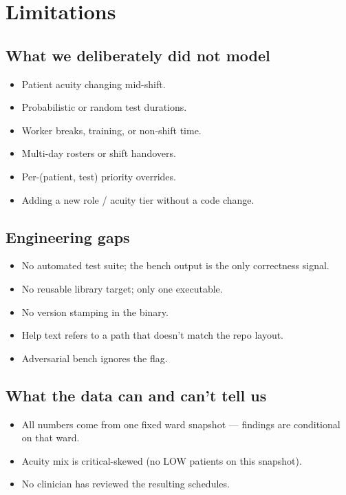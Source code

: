 \section{Limitations}
\label{sec:limitations}

\subsection{What we deliberately did not model}

\begin{itemize}
  \item Patient acuity changing mid-shift.
  \item Probabilistic or random test durations.
  \item Worker breaks, training, or non-shift time.
  \item Multi-day rosters or shift handovers.
  \item Per-(patient, test) priority overrides.
  \item Adding a new role / acuity tier without a code change.
\end{itemize}

\subsection{Engineering gaps}

\begin{itemize}
  \item No automated test suite; the bench output is the only
        correctness signal.
  \item No reusable library target; only one executable.
  \item No version stamping in the binary.
  \item Help text refers to a path that doesn't match the
        repo layout.
  \item Adversarial bench ignores the
         flag.
\end{itemize}

\subsection{What the data can and can't tell us}

\begin{itemize}
  \item All numbers come from one fixed ward snapshot --- findings
        are conditional on that ward.
  \item Acuity mix is critical-skewed (no LOW patients on this
        snapshot).
  \item No clinician has reviewed the resulting schedules.
\end{itemize}
